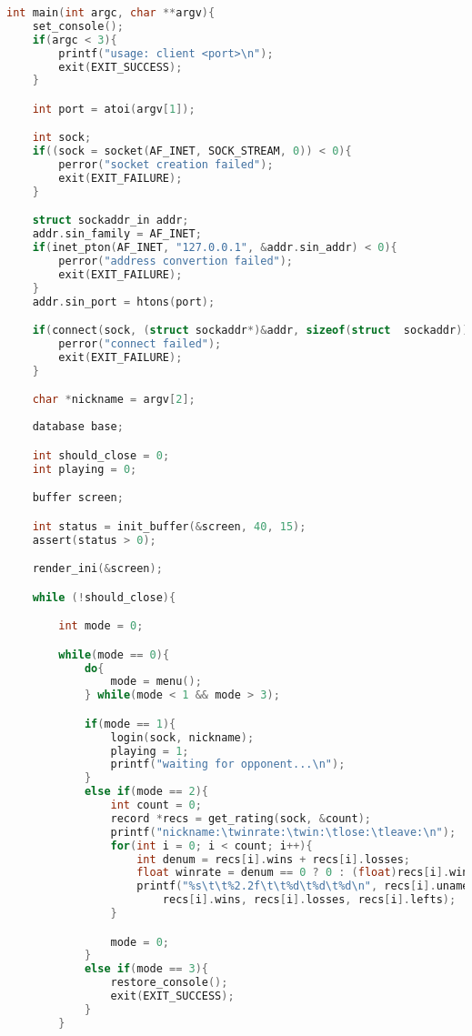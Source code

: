 \documentclass[12pt]{article}
\begin{document}
\begin{lstlisting}[language=C, basicstyle=\scriptsize]
int main(int argc, char **argv){
    set_console();
    if(argc < 3){
        printf("usage: client <port>\n");
        exit(EXIT_SUCCESS);
    }

    int port = atoi(argv[1]);

    int sock;
    if((sock = socket(AF_INET, SOCK_STREAM, 0)) < 0){
        perror("socket creation failed");
        exit(EXIT_FAILURE);
    }

    struct sockaddr_in addr;
    addr.sin_family = AF_INET;
    if(inet_pton(AF_INET, "127.0.0.1", &addr.sin_addr) < 0){
        perror("address convertion failed");
        exit(EXIT_FAILURE);
    }
    addr.sin_port = htons(port);

    if(connect(sock, (struct sockaddr*)&addr, sizeof(struct  sockaddr)) < 0){
        perror("connect failed");
        exit(EXIT_FAILURE);
    }

    char *nickname = argv[2];
    
    database base;

    int should_close = 0;
    int playing = 0;

    buffer screen;

    int status = init_buffer(&screen, 40, 15);
    assert(status > 0);

    render_ini(&screen);

    while (!should_close){

        int mode = 0;

        while(mode == 0){
            do{
                mode = menu();
            } while(mode < 1 && mode > 3);

            if(mode == 1){
                login(sock, nickname);
                playing = 1;
                printf("waiting for opponent...\n");
            }
            else if(mode == 2){
                int count = 0;
                record *recs = get_rating(sock, &count);
                printf("nickname:\twinrate:\twin:\tlose:\tleave:\n");
                for(int i = 0; i < count; i++){
                    int denum = recs[i].wins + recs[i].losses;
                    float winrate = denum == 0 ? 0 : (float)recs[i].wins / denum;
                    printf("%s\t\t%2.2f\t\t%d\t%d\t%d\n", recs[i].uname, winrate, 
                        recs[i].wins, recs[i].losses, recs[i].lefts);
                }

                mode = 0;
            }
            else if(mode == 3){
                restore_console();
                exit(EXIT_SUCCESS);
            }
        }


\end{lstlisting}
\end{document}
